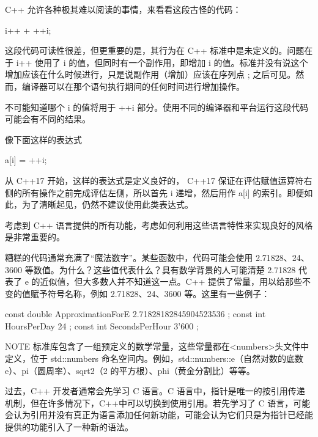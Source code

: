 
C++ 允许各种极其难以阅读的事情，来看看这段古怪的代码：

\begin{cpp}
i++ + ++i;
\end{cpp}

这段代码可读性很差，但更重要的是，其行为在 C++ 标准中是未定义的。问题在于 i++ 使用了 i 的值，但同时有一个副作用，即增加 i 的值。标准并没有说这个增加应该在什么时候进行，只是说副作用（增加）应该在序列点 ; 之后可见。然而，编译器可以在那个语句执行期间的任何时间进行增加操作。

不可能知道哪个 i 的值将用于 ++i 部分。使用不同的编译器和平台运行这段代码可能会有不同的结果。

像下面这样的表达式

\begin{cpp}
a[i] = ++i;
\end{cpp}

从 C++17 开始，这样的表达式是定义良好的， C++17 保证在评估赋值运算符右侧的所有操作之前完成评估左侧，所以首先 i 递增，然后用作 a[i] 的索引。即便如此，为了清晰起见，仍然不建议使用此类表达式。

考虑到 C++ 语言提供的所有功能，考虑如何利用这些语言特性来实现良好的风格是非常重要的。


糟糕的代码通常充满了“魔法数字”。某些函数中，代码可能会使用 2.71828、24、3600 等数值。为什么？这些值代表什么？具有数学背景的人可能清楚 2.71828 代表了 e 的近似值，但大多数人并不知道这一点。C++ 提供了常量，用以给那些不变的值赋予符号名称，例如 2.71828、24、3600 等。这里有一些例子：

\begin{cpp}
const double ApproximationForE { 2.71828182845904523536 };
const int HoursPerDay { 24 };
const int SecondsPerHour { 3'600 };
\end{cpp}

\begin{myNotic}{NOTE}
标准库包含了一组预定义的数学常量，这些常量都在<numbers>头文件中定义，位于 std::numbers 命名空间内。例如，std::numbers::e（自然对数的底数 e）、pi（圆周率）、sqrt2（2 的平方根）、phi（黄金分割比）等等。
\end{myNotic}


过去，C++ 开发者通常会先学习 C 语言。C 语言中，指针是唯一的按引用传递机制，但在许多情况下，C++中可以切换到使用引用。若先学习了 C 语言，可能会认为引用并没有真正为语言添加任何新功能，可能会认为它们只是为指针已经能提供的功能引入了一种新的语法。


